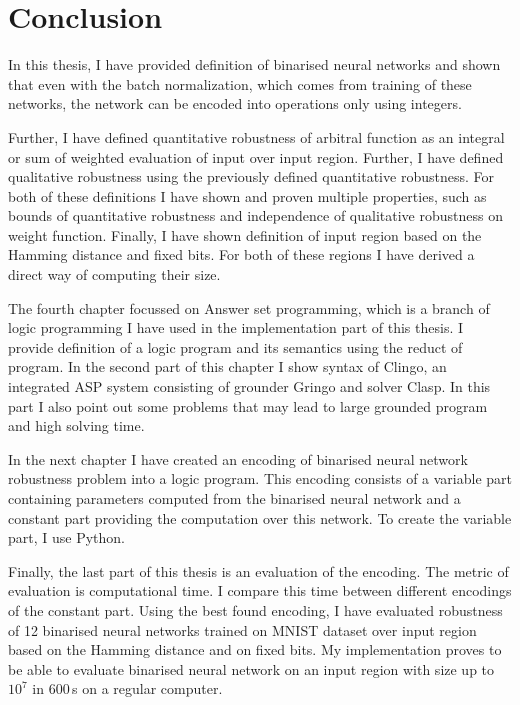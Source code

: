\chapter{Conclusion}
In this thesis, I have provided definition of binarised neural networks
and shown that even with the batch normalization, which comes from training of these
networks, the network can be encoded into operations only using integers.

Further, I have defined quantitative robustness of arbitral function
as an integral or sum of weighted evaluation of input over input region.
Further, I have defined qualitative robustness using the previously defined
quantitative robustness. For both of these definitions I have shown and proven
multiple properties, such as bounds of quantitative robustness and independence
of qualitative robustness on weight function.
Finally, I have shown definition of input region based on the Hamming distance
and fixed bits. For both of these regions I have derived a direct way
of computing their size.

The fourth chapter focussed on Answer set programming, which is a branch of logic programming
I have used in the implementation part of this thesis.
I provide definition of a logic program and its semantics using the reduct of program.
In the second part of this chapter I show syntax of Clingo, an integrated ASP system
consisting of grounder Gringo and solver Clasp. In this part I also point out
some problems that may lead to large grounded program and high solving time.

In the next chapter I have created an encoding of binarised neural network
robustness problem
into a logic program. This encoding consists of a variable part containing
parameters computed from the binarised neural network and a constant part
providing the computation over this network.
To create the variable part, I use Python.

Finally, the last part of this thesis is an evaluation of the encoding.
The metric of evaluation is computational time. I compare this time between
different encodings of the constant part. Using the best found encoding,
I have evaluated robustness of 12 binarised neural networks trained on MNIST dataset
over input region based on the Hamming distance and on fixed bits.
My implementation proves to be able to evaluate binarised neural network
on an input region with size up to $10^7$ in 600\,s on a regular computer.

